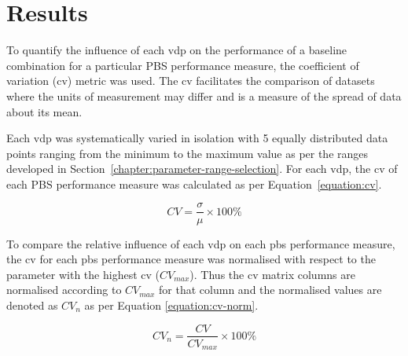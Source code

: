 \chapter{Results}\label{chapter:results}

To quantify the influence of each \gls{vdp} on the performance of a baseline combination for a particular PBS performance measure, the coefficient of variation (\gls{cv}) metric was used. The \gls{cv} facilitates the comparison of datasets where the units of measurement may differ \cite{Soong2004} and is a measure of the spread of data about its mean.

Each \gls{vdp} was systematically varied in isolation with 5 equally distributed data points ranging from the minimum to the maximum value as per the ranges developed in Section~\ref{chapter:parameter-range-selection}. For each \gls{vdp}, the \gls{cv} of each PBS performance measure was calculated as per Equation~\ref{equation:cv}.

\begin{equation}
    \label{equation:cv}
    CV = \frac{\sigma}{\mu} \times 100\%
\end{equation}

To compare the relative influence of each \gls{vdp} on each \gls{pbs} performance measure, the \gls{cv} for each \gls{pbs} performance measure was normalised with respect to the parameter with the highest \gls{cv} ($CV_{max}$). Thus the \gls{cv} matrix columns are normalised according to $CV_{max}$ for that column and the normalised values are denoted as $CV_n$ as per Equation \ref{equation:cv-norm}.

\begin{equation}
    \label{equation:cv-norm}
    CV_{n} = \frac{CV}{CV_{max}} \times 100\%
\end{equation}


